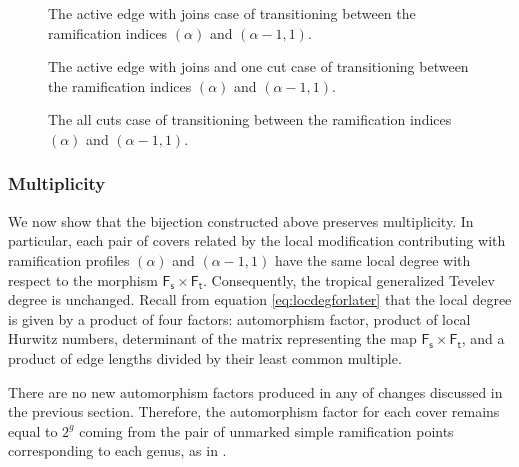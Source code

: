 \documentclass[11pt,reqno]{amsart}
\newcommand{\inputTikZ}[2]{%
     \resizebox{#1}{!}{}}
\theoremstyle{definition}
\newcommand{\Ft}{\mathsf{F_t}}
\newcommand{\Fs}{\mathsf{F_s}}
\begin{document}
\begin{figure}
    \centering
    \inputTikZ{.8\textwidth}{Figures/joins+active}
    \caption{The active edge with joins case of transitioning between the ramification indices $(\alpha)$ and $(\alpha-1,1)$.}
    \label{fig:joins+active}
\end{figure}

\begin{figure}
    \centering
    \inputTikZ{.8\textwidth}{Figures/cut+joins+active}
    \caption{The active edge with joins and one cut case of transitioning between the ramification indices $(\alpha)$ and $(\alpha-1,1)$.}
    \label{fig:cut+joins+active}
\end{figure}

\begin{figure}
    \centering
    \inputTikZ{.6\textwidth}{Figures/allcuts}
    \caption{The all cuts case of transitioning between the ramification indices $(\alpha)$ and $(\alpha-1,1)$.}
    \label{fig:allcuts}
\end{figure}


\subsubsection*{Multiplicity}
We now show that the bijection constructed above preserves multiplicity. In particular, each
pair of covers related by the local modification contributing with ramification profiles
$(\alpha)$ and $(\alpha-1,1)$ have the same local degree with respect to the morphism
$\Fs \times \Ft$. Consequently, the tropical generalized Tevelev degree is unchanged. Recall from equation \ref{eq:locdegforlater} that the local degree is given by a product of four factors: automorphism factor, product of local Hurwitz numbers, determinant of the matrix representing the map $\Fs\times\Ft$, and a product of edge lengths divided by their least common multiple. 

There are no new automorphism factors produced in any of changes discussed in the previous section. Therefore, the automorphism factor for each cover remains equal to $2^g$ coming from the pair of unmarked simple ramification points corresponding to each genus, as in \cite{troptev}. 
\end{document}
